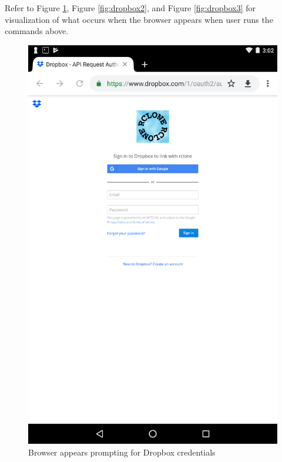 Refer to Figure \ref{fig:dropbox1}, Figure \ref{fig:dropbox2}, and Figure \ref{fig:dropbox3} for visualization of what occurs when the browser appears when user runs the commands above.
\begin{figure}[htb]
  \centering
  \includegraphics[scale=0.2]{images/dropbox1.png}
  \caption{Browser appears prompting for Dropbox credentials}
  \label{fig:dropbox1}
\end{figure}
